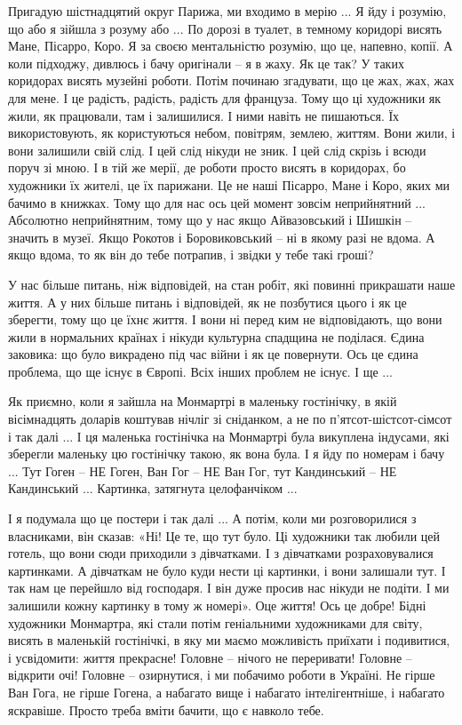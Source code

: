 Пригадую шістнадцятий округ Парижа, ми входимо в мерію ... Я йду і розумію, що
або я зійшла з розуму або ... По дорозі в туалет, в темному коридорі висять
Мане, Пісарро, Коро. Я за своєю ментальністю розумію, що це, напевно, копії. А
коли підходжу, дивлюсь і бачу оригінали – я в жаху. Як це так? У таких
коридорах висять музейні роботи. Потім починаю згадувати, що це жах, жах, жах
для мене. І це радість, радість, радість для француза. Тому що ці художники як
жили, як працювали, там і залишилися. І ними навіть не пишаються. Їх
використовують, як користуються небом, повітрям, землею, життям. Вони жили, і
вони залишили свій слід. І цей слід нікуди не зник. І цей слід скрізь і всюди
поруч зі мною. І в тій же мерії, де роботи просто висять в коридорах, бо
художники їх жителі, це їх парижани. Це не наші Пісарро, Мане і Коро, яких ми
бачимо в книжках. Тому що для нас ось цей момент зовсім неприйнятний ...
Абсолютно неприйнятним, тому що у нас якщо Айвазовський і Шишкін – значить в
музеї. Якщо Рокотов і Боровиковський – ні в якому разі не вдома. А якщо вдома,
то як він до тебе потрапив, і звідки у тебе такі гроші? 

У нас більше питань,
ніж відповідей, на стан робіт, які повинні прикрашати наше життя. А у них
більше питань і відповідей, як не позбутися цього і як це зберегти, тому що це
їхнє життя. І вони ні перед ким не відповідають, що вони жили в нормальних
країнах і нікуди культурна спадщина не поділася. Єдина заковика: що було
викрадено під час війни і як це повернути. Ось це єдина проблема, що ще існує в
Європі. Всіх інших проблем не існує. І ще ...

Як приємно, коли я зайшла на Монмартрі в маленьку гостінічку, в якій
вісімнадцять доларів коштував нічліг зі сніданком, а не по
п'ятсот-шістсот-сімсот і так далі ... І ця маленька гостінічка на Монмартрі
була викуплена індусами, які зберегли маленьку цю гостінічку такою, як вона
була. І я йду по номерам і бачу ... Тут Гоген – НЕ Гоген, Ван Гог – НЕ Ван Гог,
тут Кандинський – НЕ Кандинський ... Картинка, затягнута целофанчіком ... 

І я
подумала що це постери і так далі ... А потім, коли ми розговорилися з
власниками, він сказав: «Ні! Це те, що тут було. Ці художники так любили цей
готель, що вони сюди приходили з дівчатками. І з дівчатками розраховувалися
картинками. А дівчаткам не було куди нести ці картинки, і вони залишали тут. І
так нам це перейшло від господаря. І він дуже просив нас нікуди не подіти. І ми
залишили кожну картинку в тому ж номері». Оце життя! Ось це добре! Бідні
художники Монмартра, які стали потім геніальними художниками для світу, висять
в маленькій гостінічкі, в яку ми маємо можливість приїхати і подивитися, і
усвідомити: життя прекрасне! Головне – нічого не переривати! Головне – відкрити
очі! Головне – озирнутися, і ми побачимо роботи в Україні. Не гірше Ван Гога,
не гірше Гогена, а набагато вище і набагато інтелігентніше, і набагато
яскравіше. Просто треба вміти бачити, що є навколо тебе. 

